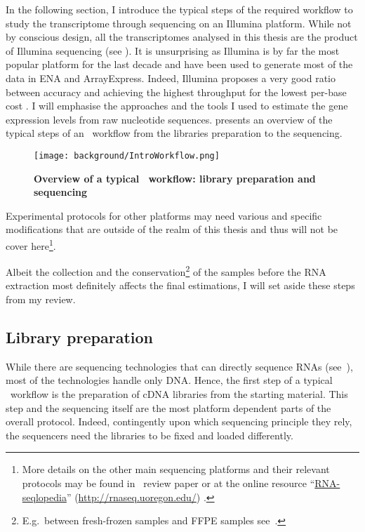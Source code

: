 In the following section,
I introduce the typical steps of the required workflow
to study the transcriptome through sequencing on an Illumina platform.
While not by conscious design, all the transcriptomes analysed in this thesis are
the product of Illumina sequencing (see
).
It is unsurprising as Illumina is by far
the most popular platform for the last decade  and
have been used to generate most of the data in \gls{ENA} and \gls{ArrayExpress}.
Indeed, Illumina proposes a very
good ratio between accuracy and achieving the highest
throughput for the lowest per-base cost .
I will emphasise the approaches and
the tools I used to estimate the gene expression levels from raw nucleotide
sequences.
 presents an overview of the typical steps of an
\Rnaseq\ workflow from the libraries preparation to the sequencing.

\begin{figure}
    \texttt{[image: background/IntroWorkflow.png]}\centering
    \caption[Overview of a \Rnaseq\ workflow: library preparation
    and sequencing]{\label{fig:OverviewRnaseqPrepSeq}\textbf{Overview of
    a typical \Rnaseq\ workflow:
    library preparation and sequencing}}
\end{figure}

Experimental protocols for other platforms may need various and specific
modifications that are outside of the realm of this thesis and thus will not be
cover here\footnote{More details on the other main sequencing platforms and their
relevant protocols may be found in~\citet{rnaseqProtocols} review paper or at the
online resource \enquote{\href{http://rnaseq.uoregon.edu/}{RNA-seqlopedia}}
(\href{http://rnaseq.uoregon.edu/}{http://rnaseq.uoregon.edu/})
.}.

Albeit the collection and the conservation\footnote{E.g.\ between fresh-frozen
samples and \gls{FFPE} samples see~\citet{sampleConservationMatters}.}
of the samples before the
\gls{RNA} extraction most definitely affects the final estimations,
I will set aside these steps from my review.

\subsection{Library preparation}\label{subsec:libPrep}

While there are sequencing technologies that can directly sequence \glspl{RNA}
(see~\cite{rnaDirectSeq}), most of the technologies handle only \gls{DNA}.
Hence, the first step of a typical \Rnaseq\ workflow is the preparation of
\gls{cDNA} libraries from the starting material. This step and the sequencing
itself are the most platform dependent parts of the overall protocol.
Indeed, contingently upon which sequencing principle they rely,
the sequencers need the libraries to be fixed and loaded differently.

